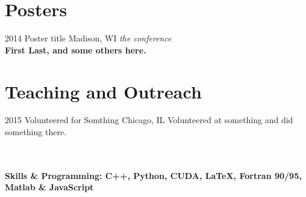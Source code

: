 \documentclass[]{template-cv} %
\begin{document}
\section{Posters}
\begin{entrylist}
\entry
{2014}
{Poster title}
{Madison, WI}
{\emph{the conference} \\
\small{} \bf{First Last,} \normalfont{} and some others here.}
\end{entrylist}
\goodbreak
\section{Teaching and Outreach}
\begin{entrylist}
\entry
{2015}
{Volunteered for Somthing}
{Chicago, IL}
{
Volunteered at something and did something there.
}
\end{entrylist}
\\
\\
\bf{Skills \& Programming:} \normalfont C++, Python, CUDA, \LaTeX, Fortran 90/95, Matlab \& JavaScript
\end{document}
